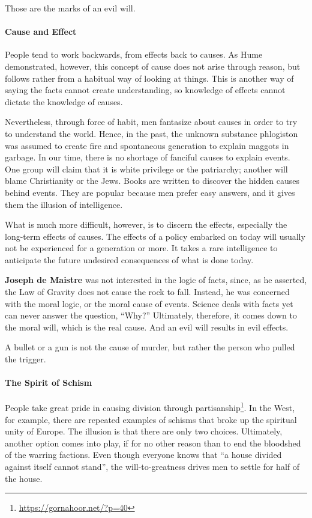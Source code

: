 Those are the marks of an evil will.

\paragraph{Cause and Effect}


People tend to work backwards, from effects back to causes. As Hume demonstrated, however, this concept of cause does not arise through reason, but follows rather from a habitual way of looking at things. This is another way of saying the facts cannot create understanding, so knowledge of effects cannot dictate the knowledge of causes.

Nevertheless, through force of habit, men fantasize about causes in order to try to understand the world. Hence, in the past, the unknown substance phlogiston was assumed to create fire and spontaneous generation to explain maggots in garbage. In our time, there is no shortage of fanciful causes to explain events. One group will claim that it is white privilege or the patriarchy; another will blame Christianity or the Jews. Books are written to discover the hidden causes behind events. They are popular because men prefer easy answers, and it gives them the illusion of intelligence.

What is much more difficult, however, is to discern the effects, especially the long-term effects of causes. The effects of a policy embarked on today will usually not be experienced for a generation or more. It takes a rare intelligence to anticipate the future undesired consequences of what is done today.

\textbf{Joseph de Maistre} was not interested in the logic of facts, since, as he asserted, the Law of Gravity does not cause the rock to fall. Instead, he was concerned with the moral logic, or the moral cause of events. Science deals with facts yet can never answer the question, ``Why?'' Ultimately, therefore, it comes down to the moral will, which is the real cause. And an evil will results in evil effects.

A bullet or a gun is not the cause of murder, but rather the person who pulled the trigger.

\paragraph{The Spirit of Schism}


People take great pride in causing division through partisanship\footnote{\url{https://gornahoor.net/?p=40}}. In the West, for example, there are repeated examples of schisms that broke up the spiritual unity of Europe. The illusion is that there are only two choices. Ultimately, another option comes into play, if for no other reason than to end the bloodshed of the warring factions. Even though everyone knows that ``a house divided against itself cannot stand'', the will-to-greatness drives men to settle for half of the house.


